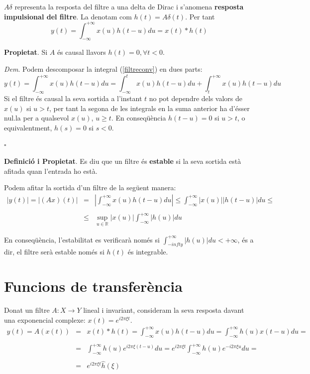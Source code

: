 \documentclass{article}
\def\R{\mathbb R}
\begin{document}
$A\delta$ representa la resposta del filtre a una delta de Dirac i s'anomena 
{\bf resposta impulsional del filtre}. La denotam com $h(t)=A\delta(t)$. 
Per tant 
\begin{equation}
\label{filtreconv}
y(t)=\int_{-\infty}^{+\infty} x(u) h(t-u) du=x(t) * h(t)
\end{equation}
 
\noindent
{\bf Propietat}. Si $A$ \'es causal llavors $h(t)=0, \forall t < 0$.

\noindent
{\it Dem}. Podem descomposar la integral (\ref{filtreconv}) en dues parts:
\[
y(t)=\int_{-\infty}^{+\infty} x(u) h(t-u) du=\int_{-\infty}^{t} x(u) h(t-u) du + 
\int_{t}^{+\infty} x(u) h(t-u) du
\]
Si el filtre \'es causal la seva sortida a l'instant $t$ no pot dependre dels valors de $x(u)$ si
$u > t$, per tant la segona de les integrals en la suma anterior ha d'\'esser nul.la per a qualsevol
$x(u)$, $u \geq t$. En conseq\"u\`encia $h(t-u)=0$ si $u > t$, o equivalentment, $h(s)=0$ si $s < 0$.
\begin{flushright}
$\square$
\end{flushright}

\noindent
{\bf Definici\'o i Propietat}. Es diu que un filtre \'es {\bf estable} si la seva sortida est\`a
afitada quan l'entrada ho est\`a.

Podem afitar la sortida d'un filtre de la seg\"uent manera:
\[
\begin{array}{rcl}
|y(t)|=|(Ax)(t)| & = & 
|\int_{-\infty}^{+\infty} x(u) h(t-u) du| \leq \int_{-\infty}^{+\infty} |x(u)| |h(t-u)| du \leq \\
\\
                 & \leq & \sup_{u \in \R} |x(u)| \int_{-\infty}^{+\infty} |h(u)| du
\end{array}
\]

En conseq\"u\`encia, l'estabilitat es verificar\`a nom\'es si $\int_{-infty}^{+\infty} |h(u)| du < +\infty$,
\'es a dir, el filtre ser\`a estable nom\'es si $h(t)$ \'es integrable.


\section{Funcions de transfer\`encia}
Donat un filtre $A: X \rightarrow Y$ lineal i invariant, consideram la seva resposta davant una 
exponencial complexe: $x(t)=e^{i 2 \pi \xi t}$.
\[
\begin{array}{rcl}
y(t)=A(x(t)) & = & x(t)*h(t)=\int_{-\infty}^{+\infty} x(u) h(t-u) du = \int_{-\infty}^{+\infty} h(u) x(t-u) du =\\
\\
             & = & \int_{-\infty}^{+\infty} h(u) e^{i 2 \pi \xi (t-u)} du = 
                   e^{i 2 \pi \xi t} \int_{-\infty}^{+\infty} h(u) e^{-i 2 \pi \xi u} du =\\
\\
             & = & e^{i 2 \pi \xi t} \hat{h}(\xi)
\end{array}
\]
\end{document}
